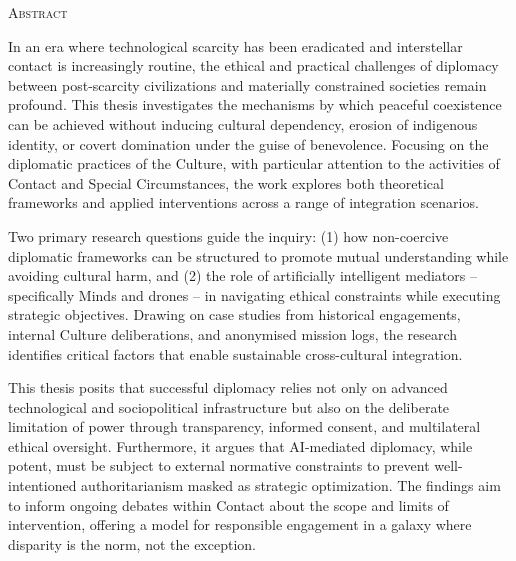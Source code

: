 \cleardoublepageforprint	%

{}

{\LARGE\textsc{Abstract}}

\par \vspace{5mm}

In an era where technological scarcity has been eradicated and interstellar contact is increasingly routine, the ethical and practical challenges of diplomacy between post-scarcity civilizations and materially constrained societies remain profound. This thesis investigates the mechanisms by which peaceful coexistence can be achieved without inducing cultural dependency, erosion of indigenous identity, or covert domination under the guise of benevolence. Focusing on the diplomatic practices of the Culture, with particular attention to the activities of Contact and Special Circumstances, the work explores both theoretical frameworks and applied interventions across a range of integration scenarios.

Two primary research questions guide the inquiry: (1) how non-coercive diplomatic frameworks can be structured to promote mutual understanding while avoiding cultural harm, and (2) the role of artificially intelligent mediators -- specifically Minds and drones -- in navigating ethical constraints while executing strategic objectives. Drawing on case studies from historical engagements, internal Culture deliberations, and anonymised mission logs, the research identifies critical factors that enable sustainable cross-cultural integration.

This thesis posits that successful diplomacy relies not only on advanced technological and sociopolitical infrastructure but also on the deliberate limitation of power through transparency, informed consent, and multilateral ethical oversight. Furthermore, it argues that AI-mediated diplomacy, while potent, must be subject to external normative constraints to prevent well-intentioned authoritarianism masked as strategic optimization. The findings aim to inform ongoing debates within Contact about the scope and limits of intervention, offering a model for responsible engagement in a galaxy where disparity is the norm, not the exception.

